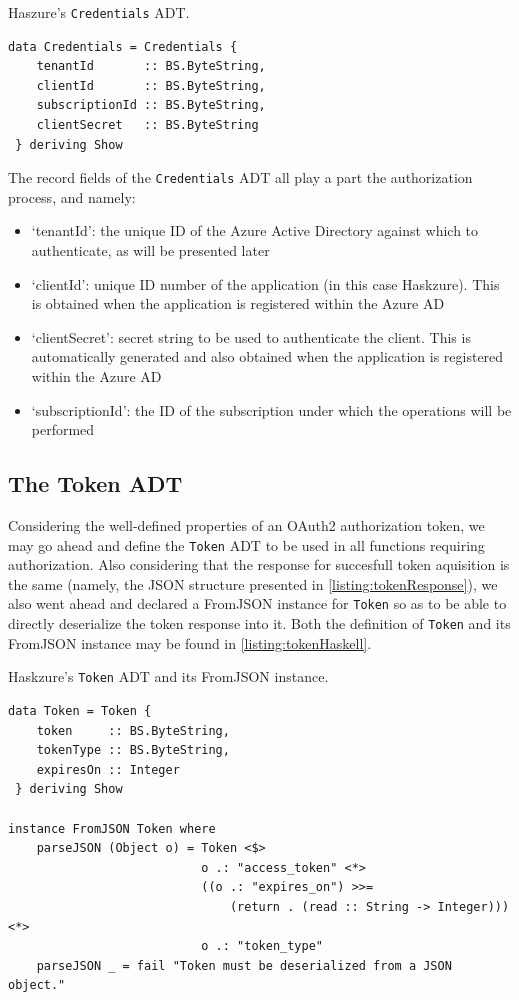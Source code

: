 \documentclass[11pt]{report}
\begin{document}
\begin{listing}[H]
\caption{Haszure's \texttt{Credentials} ADT.}
\label{listing:credentialsHaskell}
\begin{verbatim}
data Credentials = Credentials {
    tenantId       :: BS.ByteString,
    clientId       :: BS.ByteString,
    subscriptionId :: BS.ByteString,
    clientSecret   :: BS.ByteString
 } deriving Show
\end{verbatim}
\end{listing}

The record fields of the \texttt{Credentials} ADT all play a part the
authorization process, and namely:

\begin{itemize}
    \item{`tenantId'}: the unique ID of the Azure Active Directory against
        which to authenticate, as will be presented later
    \item{`clientId'}: unique ID number of the application (in this case
        Haskzure). This is obtained when the application is registered within
        the Azure AD
    \item{`clientSecret'}: secret string to be used to authenticate the client.
        This is automatically generated and also obtained when the application
        is registered within the Azure AD
    \item{`subscriptionId'}: the ID of the subscription under which the
        operations will be performed
\end{itemize}

\subsection{The Token ADT}

Considering the well-defined properties of an OAuth2 authorization token, we
may go ahead and define the \texttt{Token} ADT to be used in all functions
requiring authorization. Also considering that the response for succesfull
token aquisition is the same (namely, the JSON structure presented in
\autoref{listing:tokenResponse}), we also went ahead and declared a FromJSON
instance for \texttt{Token} so as to be able to directly deserialize the token
response into it. Both the definition of \texttt{Token} and its FromJSON
instance may be found in \autoref{listing:tokenHaskell}.

\begin{listing}[H]
\caption{Haskzure's \texttt{Token} ADT and its FromJSON instance.}
\label{listing:tokenHaskell}
\begin{verbatim}
data Token = Token {
    token     :: BS.ByteString,
    tokenType :: BS.ByteString,
    expiresOn :: Integer
 } deriving Show

instance FromJSON Token where
    parseJSON (Object o) = Token <$>
                           o .: "access_token" <*>
                           ((o .: "expires_on") >>=
                               (return . (read :: String -> Integer))) <*>
                           o .: "token_type"
    parseJSON _ = fail "Token must be deserialized from a JSON object."
\end{verbatim}
\end{listing}
\end{document}
